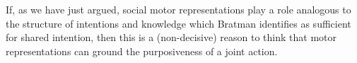 \documentclass[12pt,\papersize]{extarticle}
\begin{document}
If, as we have just argued, social motor representations play a role analogous to the structure of intentions and knowledge which Bratman identifies as sufficient for shared intention, then this is a  (non-decisive)  reason to think that motor representations can ground the purposiveness of a joint action.

%
%
%
\end{document}
